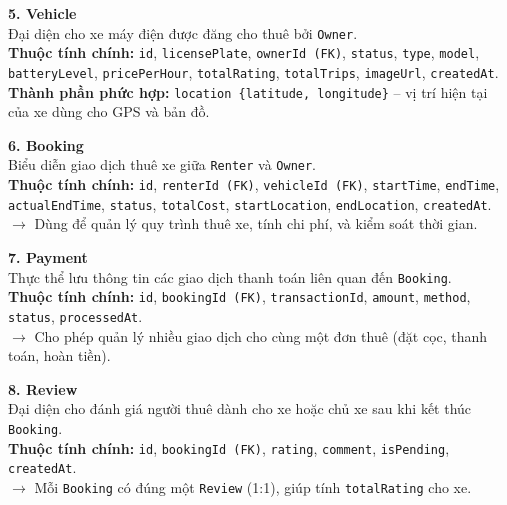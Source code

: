 \vspace{6pt}

\textbf{5. Vehicle} \\[4pt]
Đại diện cho xe máy điện được đăng cho thuê bởi \texttt{Owner}. \\[2pt]
\textbf{Thuộc tính chính:} \texttt{id}, \texttt{licensePlate}, \texttt{ownerId (FK)}, \texttt{status}, \texttt{type}, \texttt{model}, \texttt{batteryLevel}, \texttt{pricePerHour}, \texttt{totalRating}, \texttt{totalTrips}, \texttt{imageUrl}, \texttt{createdAt}. \\[2pt]
\textbf{Thành phần phức hợp:} \texttt{location \{latitude, longitude\}} – vị trí hiện tại của xe dùng cho GPS và bản đồ.

\vspace{6pt}

\textbf{6. Booking} \\[4pt]
Biểu diễn giao dịch thuê xe giữa \texttt{Renter} và \texttt{Owner}. \\[2pt]
\textbf{Thuộc tính chính:} \texttt{id}, \texttt{renterId (FK)}, \texttt{vehicleId (FK)}, \texttt{startTime}, \texttt{endTime}, \texttt{actualEndTime}, \texttt{status}, \texttt{totalCost}, \texttt{startLocation}, \texttt{endLocation}, \texttt{createdAt}. \\[2pt]
$\rightarrow$ Dùng để quản lý quy trình thuê xe, tính chi phí, và kiểm soát thời gian.

\vspace{6pt}

\textbf{7. Payment} \\[4pt]
Thực thể lưu thông tin các giao dịch thanh toán liên quan đến \texttt{Booking}. \\[2pt]
\textbf{Thuộc tính chính:} \texttt{id}, \texttt{bookingId (FK)}, \texttt{transactionId}, \texttt{amount}, \texttt{method}, \texttt{status}, \texttt{processedAt}. \\[2pt]
$\rightarrow$ Cho phép quản lý nhiều giao dịch cho cùng một đơn thuê (đặt cọc, thanh toán, hoàn tiền).

\vspace{6pt}

\textbf{8. Review} \\[4pt]
Đại diện cho đánh giá người thuê dành cho xe hoặc chủ xe sau khi kết thúc \texttt{Booking}. \\[2pt]
\textbf{Thuộc tính chính:} \texttt{id}, \texttt{bookingId (FK)}, \texttt{rating}, \texttt{comment}, \texttt{isPending}, \texttt{createdAt}. \\[2pt]
$\rightarrow$ Mỗi \texttt{Booking} có đúng một \texttt{Review} (1:1), giúp tính \texttt{totalRating} cho xe.

